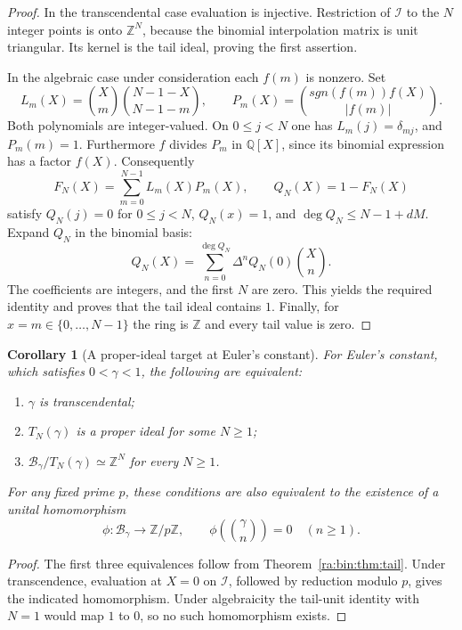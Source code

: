 \documentclass[11pt,a4paper]{article}
\newcommand{\Q}{\mathbb Q}
\newcommand{\Z}{\mathbb Z}
\newtheorem{corollary}[theorem]{Corollary}
\theoremstyle{definition}
\theoremstyle{remark}
\theoremstyle{plain}
\numberwithin{equation}{section}
\def\operatorname#1{#1}\def\mathrm#1{#1}}
\begin{document}
\begin{proof}
In the transcendental case evaluation is injective.  Restriction
of $\mathcal I$ to the $N$ integer points is onto $\Z^N$,
because the binomial interpolation matrix is unit triangular.
Its kernel is the tail ideal, proving the first assertion.

In the algebraic case under consideration each $f(m)$ is nonzero.
Set
\[
 L_m(X)=\binom Xm\binom{N-1-X}{N-1-m},\qquad
 P_m(X)=\binom{\operatorname{sgn}(f(m))f(X)}{|f(m)|}.
\]
Both polynomials are integer-valued.  On $0\le j<N$ one has
$L_m(j)=\delta_{mj}$, and $P_m(m)=1$.
Furthermore $f$ divides $P_m$ in $\Q[X]$, since its binomial
expression has a factor $f(X)$.  Consequently
\[
 F_N(X)=\sum_{m=0}^{N-1}L_m(X)P_m(X),\qquad
 Q_N(X)=1-F_N(X)
\]
satisfy $Q_N(j)=0$ for $0\le j<N$, $Q_N(x)=1$, and
$\deg Q_N\le N-1+dM$.  Expand $Q_N$ in the binomial basis:
\[
 Q_N(X)=\sum_{n=0}^{\deg Q_N}\Delta^nQ_N(0)\binom Xn.
\]
The coefficients are integers, and the first $N$ are zero.
This yields the required identity and proves that the tail ideal
contains $1$.  Finally, for $x=m\in\{0,\ldots,N-1\}$ the
ring is $\Z$ and every tail value is zero.
\end{proof}

\begin{corollary}[A proper-ideal target at Euler's constant]
\label{ra:bin:cor:gamma}
For Euler's constant, which satisfies $0<\gamma<1$, the following
are equivalent:
\begin{enumerate}
\item $\gamma$ is transcendental;
\item $T_N(\gamma)$ is a proper ideal for some $N\ge1$;
\item $\mathcal B_\gamma/T_N(\gamma)\simeq\Z^N$ for every $N\ge1$.
\end{enumerate}
For any fixed prime $p$, these conditions are also equivalent to
the existence of a unital homomorphism
\[
 \phi:\mathcal B_\gamma\longrightarrow\Z/p\Z,
 \qquad \phi\!\left(\binom\gamma n\right)=0\quad(n\ge1).
\]
\end{corollary}

\begin{proof}
The first three equivalences follow from Theorem~\ref{ra:bin:thm:tail}.
Under transcendence, evaluation at $X=0$ on $\mathcal I$, followed
by reduction modulo $p$, gives the indicated homomorphism.
Under algebraicity the tail-unit identity with $N=1$ would map
$1$ to $0$, so no such homomorphism exists.
\end{proof}
\end{document}
